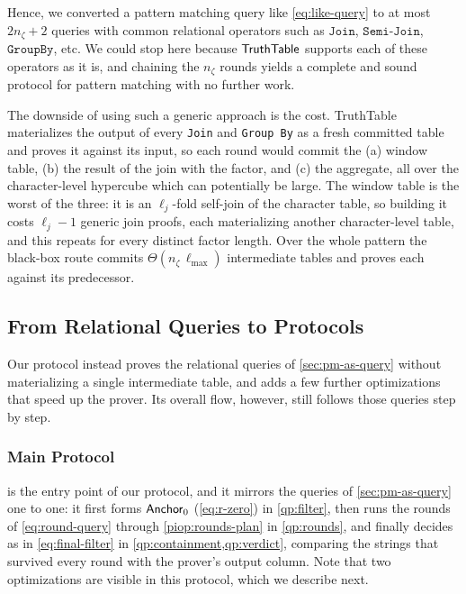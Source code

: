 Hence, we converted a pattern matching query like \cref{eq:like-query} to at most $2n_\zeta+2$ queries with common relational operators such as $\texttt{Join}$, $\texttt{Semi-Join}$, $\texttt{GroupBy}$, etc.
We could stop here because $\mathsf{TruthTable}$ supports each of these operators as it is, and chaining the $n_\zeta$ rounds yields a complete and sound protocol for pattern matching with no further work.

The downside of using such a generic approach is the cost.
TruthTable materializes the output of every \texttt{Join} and \texttt{Group By} as a fresh committed table and proves it against its input, so each round would commit the (a) window table, (b) the result of the join with the factor, and (c) the aggregate, all over the character-level hypercube which can potentially be large.
The window table is the worst of the three: it is an $\ell_j$-fold self-join of the character table, so building it costs $\ell_j-1$ generic join proofs, each materializing another character-level table, and this repeats for every distinct factor length. Over the whole pattern the black-box route commits $\Theta(n_\zeta\,\ell_{\max})$ intermediate tables and proves each against its predecessor.

\subsection{From Relational Queries to Protocols}
\label{sec:queries-to-protocols}

Our protocol instead proves the relational queries of \cref{sec:pm-as-query} without materializing a single intermediate table, and adds a few further optimizations that speed up the prover. Its overall flow, however, still follows those queries step by step.

\subsubsection{Main Protocol}
 is the entry point of our protocol, and it mirrors the queries of \cref{sec:pm-as-query} one to one: it first forms $\mathsf{Anchor}_{0}$ (\cref{eq:r-zero}) in \cref{qp:filter}, then runs the rounds of \cref{eq:round-query} through \cref{piop:rounds-plan} in \cref{qp:rounds}, and finally decides as in \cref{eq:final-filter} in \cref{qp:containment,qp:verdict}, comparing the strings that survived every round with the prover's output column.
Note that two optimizations are visible in this protocol, which we describe next.

